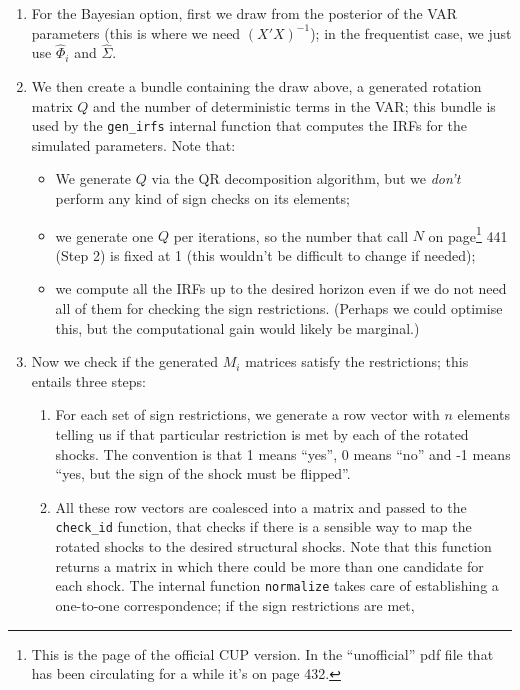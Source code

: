 \documentclass[a4paper,10pt]{article}
\begin{document}
\begin{enumerate}
\item For the Bayesian option, first we draw from the posterior of the
  VAR parameters (this is where we need $(X'X)^{-1}$); in the
  frequentist case, we just use $\hat{\Phi}_i$ and $\hat{\Sigma}$.
\item We then create a bundle containing the draw above, a generated
  rotation matrix $Q$ and the number of deterministic terms in the
  VAR; this bundle is used by the \verb|gen_irfs| internal function
  that computes the IRFs for the simulated parameters. Note that:
  \begin{itemize}
    \item We generate $Q$ via the QR decomposition algorithm, but we
      \emph{don't} perform any kind of sign checks on its elements;
    \item we generate one $Q$ per iterations, so the number that
      \citet{KilianLuetkepohl2017book} call $N$ on page\footnote{This is the page
        of the official CUP version. In the ``unofficial'' pdf file
        that has been circulating for a while it's on page 432.} 441
      (Step 2) is fixed at 1 (this wouldn't be difficult to change if
      needed);
    \item we compute all the IRFs up to the desired horizon even if we
      do not need all of them for checking the sign restrictions. 
      (Perhaps we could optimise this, but the computational
      gain would likely be marginal.)
    \end{itemize}
  \item Now we check if the generated $M_i$ matrices satisfy the
    restrictions; this entails three steps:
    \begin{enumerate}
    \item For each set of sign restrictions, we generate a row vector
      with $n$ elements telling us if that particular restriction
      is met by each of the rotated shocks. The convention is that 1
      means ``yes'', 0 means ``no'' and -1 means ``yes, but the sign
      of the shock must be flipped''.
    \item All these row vectors are coalesced into a matrix and passed
      to the \verb|check_id| function, that checks if there is a
      sensible way to map the rotated shocks to the desired structural
      shocks. Note that this function returns a matrix in which there
      could be more than one candidate for each shock. The internal
      function \texttt{normalize} takes care of establishing a
      one-to-one correspondence; if the sign restrictions are met,

\end{enumerate}
\end{enumerate}
\end{document}
